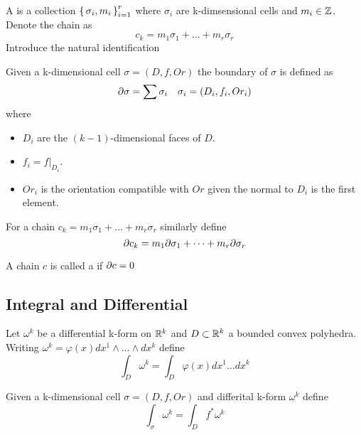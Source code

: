 \documentclass{article}
\begin{document}
\begin{definition}
A  is a collection $\set{\sigma_i, m_i}_{i=1}^r$ where $\sigma_i$ are k-dimsensional cells and $m_i \in \mathbb{Z}$. Denote the chain as 
\[
c_k = m_1 \sigma_1 + \dots + m_r \sigma_r
\]
Introduce the natural identification 
\end{definition}

\begin{definition}[Boundary]
Given a k-dimensional cell $\sigma=(D,f,Or)$ the boundary of $\sigma$ is defined as 
\[
\partial \sigma = \sum \sigma_i \quad  \sigma_i = (D_i, f_i, Or_i)
\]
where 
\begin{itemize}
    \item $D_i$ are the $(k-1)$-dimensional faces of $D$. 
    \item $f_i = f\rvert_{D_i}$.
    \item $Or_i$ is the orientation compatible with $Or$ given the normal to $D_i$ is the first element. 
\end{itemize}
For a chain $c_k = m_1 \sigma_1 + \dots + m_r \sigma_r$ similarly define 
\[
\partial c_k = m_1 \partial\sigma_1 + \dots + m_r \partial\sigma_r
\]
\end{definition}

\begin{definition}[Cycle]
A chain $c$ is called a  if $\partial c =0$
\end{definition}

\subsection{Integral and Differential}

\begin{definition}
Let $\omega^k$ be a differential k-form on $\mathbb{R}^k$ and $D\subset \mathbb{R}^k$ a bounded convex polyhedra. Writing $\omega^k = \varphi(x) dx^1 \wedge \dots \wedge dx^k $ define 
\[
\int_D \omega^k = \int_D \varphi(x) dx^1\dots dx^k
\]
\end{definition}

\begin{definition}
Given a k-dimensional cell $\sigma=(D,f,Or)$ and differital k-form $\omega^k$ define 
\[
\int_\sigma \omega^k = \int_D f^\ast \omega^k 
\]
\end{definition}
\end{document}
